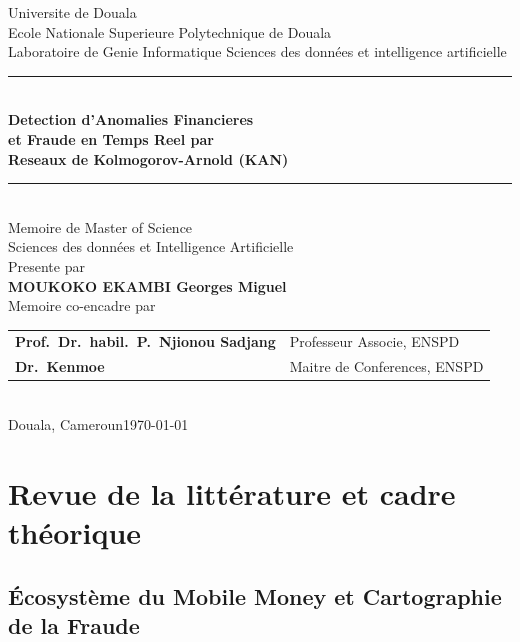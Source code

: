 \documentclass[11pt,a4paper,oneside]{report}
\theoremstyle{definition}
\theoremstyle{remark}
\begin{document}
\begin{titlepage}
  \centering\vspace*{0.5cm}
  {\large Universite de Douala}\\[0.2cm]
  {\large Ecole Nationale Superieure Polytechnique de Douala}\\[0.15cm]
  {\normalsize Laboratoire de Genie Informatique Sciences des données et intelligence artificielle}\\[1.2cm]
  \rule{\linewidth}{0.5pt}\\[0.4cm]
  {\LARGE\bfseries
    Detection d'Anomalies Financieres\\[0.2cm]
    et Fraude en Temps Reel par\\[0.2cm]
    Reseaux de Kolmogorov-Arnold (KAN)}\\[0.4cm]
  \rule{\linewidth}{0.5pt}\\[0.9cm]
  {\large Memoire de Master of Science}\\[0.1cm]
  {\normalsize Sciences des données et Intelligence Artificielle}\\[1.2cm]
  {\large Presente par}\\[0.2cm]
  {\Large\bfseries MOUKOKO EKAMBI Georges Miguel}\\[1.2cm]
  {\normalsize Memoire co-encadre par}\\[0.3cm]
  \begin{tabular}{ll}
    \textbf{Prof.\ Dr.\ habil.\ P.\ Njionou Sadjang} & Professeur Associe, ENSPD\\
    \textbf{Dr.\ Kenmoe}   & Maitre de Conferences, ENSPD\\
  \end{tabular}\\[1.5cm]
  {\normalsize Douala, Cameroun\quad\textbullet\quad\today}
\end{titlepage}

\newpage

\tableofcontents

\part{Revue de la littérature et cadre théorique}

\chapter{Écosystème du Mobile Money et Cartographie de la Fraude}
\end{document}
